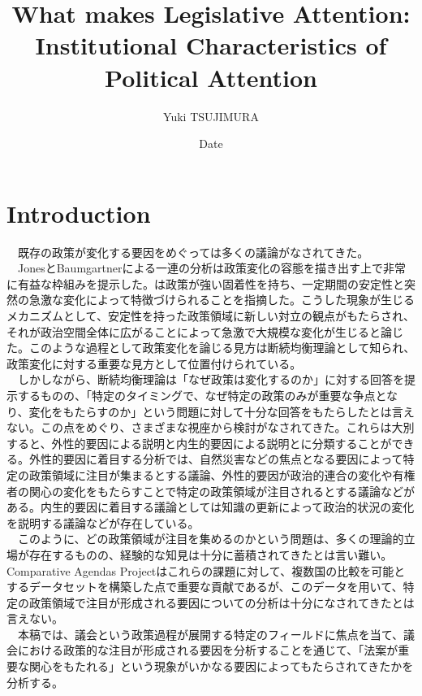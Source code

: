 \documentclass{article}
\title{What makes Legislative Attention: Institutional Characteristics of Political Attention}
\author{Yuki TSUJIMURA}
\date{Date}
\begin{document}
\maketitle

\section{Introduction}
　既存の政策が変化する要因をめぐっては多くの議論がなされてきた。\\
　JonesとBaumgartnerによる一連の分析\citep*{Baumgartner2010-rl, Baumgartner2009-eb,Baumgartner2020-ee}は政策変化の容態を描き出す上で非常に有益な枠組みを提示した。\citet*{Baumgartner2010-rl}は政策が強い固着性を持ち、一定期間の安定性と突然の急激な変化によって特徴づけられることを指摘した。こうした現象が生じるメカニズムとして、安定性を持った政策領域に新しい対立の観点がもたらされ、それが政治空間全体に広がることによって急激で大規模な変化が生じると論じた。\citep*{Baumgartner2010-rl}このような過程として政策変化を論じる見方は断続均衡理論として知られ、政策変化に対する重要な見方として位置付けられている。\citep*{Howlett2009-tn,John2018-im}\\
　しかしながら、断続均衡理論は「なぜ政策は変化するのか」に対する回答を提示するものの、「特定のタイミングで、なぜ特定の政策のみが重要な争点となり、変化をもたらすのか」という問題に対して十分な回答をもたらしたとは言えない。\citep*{John2018-im}この点をめぐり、さまざまな視座から検討がなされてきた。これらは大別すると、外性的要因による説明と内生的要因による説明とに分類することができる。外性的要因に着目する分析では、自然災害などの焦点となる要因によって特定の政策領域に注目が集まるとする議論\citep*{Birkland1997-lq,Birkland1998-xp}、外性的要因が政治的連合の変化\citep*{Sabatier1993-id}や有権者の関心の変化\citep*{Bertelli2013-zq}をもたらすことで特定の政策領域が注目されるとする議論などがある。内生的要因に着目する議論としては知識の更新によって政治的状況の変化を説明する議論\citep*{Baumgartner2010-rl}などが存在している。\\
　このように、どの政策領域が注目を集めるのかという問題は、多くの理論的立場が存在するものの、経験的な知見は十分に蓄積されてきたとは言い難い。Comparative Agendas Projectはこれらの課題に対して、複数国の比較を可能とするデータセットを構築した点で重要な貢献であるが、このデータを用いて、特定の政策領域で注目が形成される要因についての分析は十分になされてきたとは言えない。\\
　本稿では、議会という政策過程が展開する特定のフィールドに焦点を当て、議会における政策的な注目が形成される要因を分析することを通じて、「法案が重要な関心をもたれる」という現象がいかなる要因によってもたらされてきたかを分析する。\\
\end{document}
